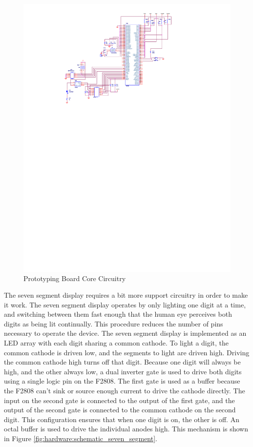 \begin{figure}[ptb]
	\begin{centering}
		\includegraphics[scale=1.3]{Hardware/Figures/hardware-schematic_core.pdf}
		\caption{Prototyping Board Core Circuitry}
		\label{fig:hardware:schematic_core}
	\end{centering}
\end{figure}

The seven segment display requires a bit more support circuitry in order to make it work. The seven segment display operates by only lighting one digit at a time, and switching between them fast enough that the human eye perceives both digits as being lit continually. This procedure reduces the number of pins necessary to operate the device. The seven segment display is implemented as an LED array with each digit sharing a common cathode. To light a digit, the common cathode is driven low, and the segments to light are driven high. Driving the common cathode high turns off that digit. Because one digit will always be high, and the other always low, a dual inverter gate is used to drive both digits using a single logic pin on the F2808. The first gate is used as a buffer because the F2808 can't sink or source enough current to drive the cathode directly. The input on the second gate is connected to the output of the first gate, and the output of the second gate is connected to the common cathode on the second digit. This configuration ensures that when one digit is on, the other is off. An octal buffer is used to drive the individual anodes high. This mechanism is shown in Figure \ref{fig:hardware:schematic_seven_segment}.

